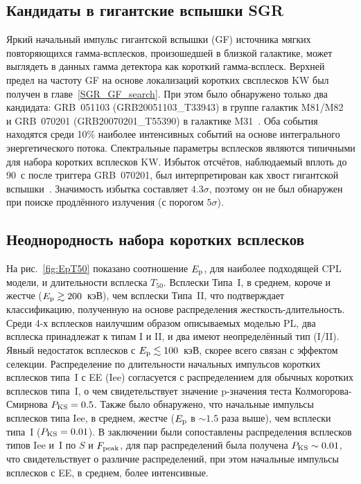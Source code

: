 \subsection{Кандидаты в гигантские вспышки SGR}
Яркий начальный импульс гигантской вспышки (GF) источника мягких повторяющихся гамма-всплесков, 
произошедшей в близкой галактике, может выглядеть в данных гамма детектора как короткий гамма-всплеск. 
Верхней предел на частоту GF на основе локализаций коротких свсплесков KW был
получен в главе~\ref{SGR_GF_search}. При этом было обнаружено только два кандидата:
GRB~051103 (GRB20051103\_T33943) в группе галактик M81/M82~\citep{Frederiks_2007AstLett} и 
GRB~070201 (GRB20070201\_T55390) в галактике M31~\citep{Mazets_2008ApJ}.
Оба события находятся среди 10\% наиболее интенсивных событий на основе интегрального 
энергетического потока. Спектральные параметры всплесков являются типичными для 
набора коротких всплесков KW.
Избыток отсчётов, наблюдаемый вплоть до 90~с после триггера GRB~070201, 
был интерпретирован как хвост гигантской вспышки~\citep{Mazets_2008ApJ}.
Значимость избытка составляет $4.3\sigma$, поэтому он не был обнаружен при 
поиске продлённого излучения (с порогом $5\sigma$).

\subsection{Неоднородность набора коротких всплесков}
На рис.~\ref{fig:EpT50} показано соотношение $E_{\mathrm{p}}$, для наиболее подходящей CPL модели,
и длительности всплеска $T_{50}$. Всплески Типа~I, в среднем, короче и жестче 
($E_{\mathrm{p}}\gtrsim 200$~кэВ), чем всплески Типа~II, что подтверждает классификацию,
полученную на основе распределения жесткость-длительность.
Среди 4-х всплесков наилучшим образом описываемых моделью PL, два всплеска принадлежат к типам I и II,
и два имеют неопределённый тип (I/II). Явный недостаток всплесков с $E_{\mathrm{p}}\lesssim 100$~кэВ,
скорее всего связан с эффектом селекции. 
Распределение по длительности начальных импульсов коротких всплесков типа~I с EE (Iee) согласуется с 
распределением для обычных коротких всплесков типа~I, о чем свидетельствует значение p-значения
теста Колмогорова-Смирнова $P_{\mathrm{KS}}=0.5$. Также было обнаружено, что
начальные импульсы всплесков типа Iee, в среднем, жестче ($E_{\mathrm{p}}$ в $\sim 1.5$ раза выше),
чем всплески типа~I ($P_{\mathrm{KS}} = 0.01$). В заключении были сопоставлены распределения 
всплесков типов Iee и~I по $S$ и $F_{\mathrm{peak}}$, для пар распределений 
была получена $P_{\mathrm{KS}} \sim 0.01$, что свидетельствует о различие распределений,
при этом начальные импульсы всплесков с EE, в среднем, более интенсивные.

